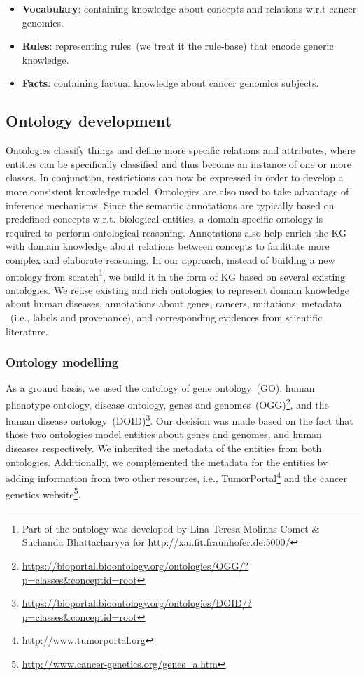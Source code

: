 \vspace{-2mm}
\begin{itemize}[noitemsep]
    \item \textbf{Vocabulary}: containing knowledge about concepts and relations w.r.t cancer genomics. 
    \item \textbf{Rules}: representing rules~(we treat it the rule-base) that encode generic knowledge. 
    \item \textbf{Facts}: containing factual knowledge about cancer genomics subjects.
    \vspace{-4mm}
\end{itemize}

\subsection{Ontology development}
Ontologies classify things and define more specific relations and attributes, where entities can be specifically classified and thus become an
instance of one or more classes. In conjunction, restrictions can now be expressed in order to develop a more consistent knowledge model. Ontologies are also used to take advantage of inference mechanisms. Since the semantic annotations are typically based on predefined concepts w.r.t. biological entities, a domain-specific ontology is required to perform ontological reasoning. Annotations also help enrich the KG with domain knowledge about relations between concepts to facilitate more complex and elaborate reasoning. In our approach, instead of building a new ontology from scratch\footnote{Part of the ontology was developed by Lina Teresa Molinas Comet \& Suchanda Bhattacharyya for \url{http://xai.fit.fraunhofer.de:5000/}}, we build it in the form of KG based on several existing ontologies. We reuse existing and rich ontologies to represent domain knowledge about human diseases, annotations about genes, cancers, mutations, metadata ~(i.e., labels and provenance), and corresponding evidences from scientific literature. 

\subsubsection{Ontology modelling}
As a ground basis, we used the ontology of gene ontology~(GO), human phenotype ontology, disease ontology, genes and genomes~(OGG)\footnote{\url{https://bioportal.bioontology.org/ontologies/OGG/?p=classes&conceptid=root}}, and the human disease ontology~(DOID)\footnote{\url{https://bioportal.bioontology.org/ontologies/DOID/?p=classes&conceptid=root}}. Our decision was made based on the fact that those two ontologies model entities about genes and genomes, and human diseases respectively. We inherited the metadata of the entities from both ontologies. Additionally, we complemented the metadata for the entities by adding information from two other resources, i.e., TumorPortal\footnote{\url{http://www.tumorportal.org}} and the cancer genetics website\footnote{\url{http://www.cancer-genetics.org/genes_a.htm}}. 

